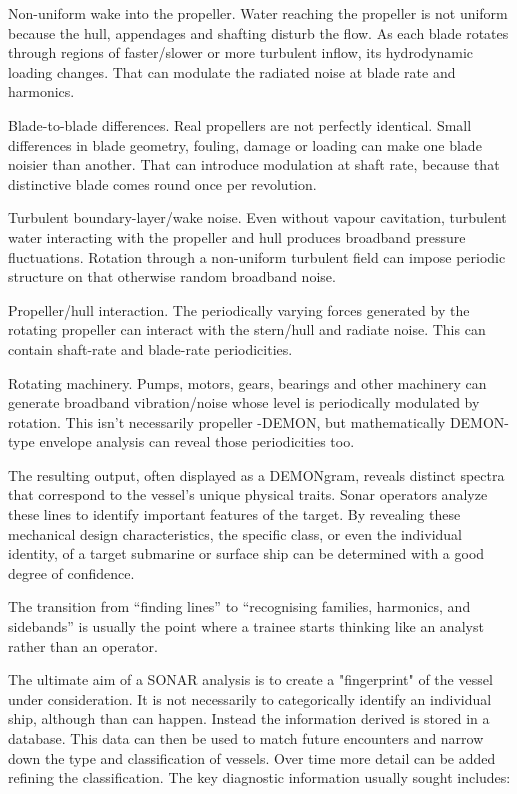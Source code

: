 \begin{compactitem}
    \item Non-uniform wake into the propeller. Water reaching the propeller is not uniform because the hull, appendages and shafting disturb the flow. As each blade rotates through regions of faster/slower or more turbulent inflow, its hydrodynamic loading changes. That can modulate the radiated noise at blade rate and harmonics.
    \item Blade-to-blade differences. Real propellers are not perfectly identical. Small differences in blade geometry, fouling, damage or loading can make one blade noisier than another. That can introduce modulation at shaft rate, because that distinctive blade comes round once per revolution.
    \item Turbulent boundary-layer/wake noise. Even without vapour cavitation, turbulent water interacting with the propeller and hull produces broadband pressure fluctuations. Rotation through a non-uniform turbulent field can impose periodic structure on that otherwise random broadband noise.
    \item Propeller/hull interaction. The periodically varying forces generated by the rotating propeller can interact with the stern/hull and radiate noise. This can contain shaft-rate and blade-rate periodicities.
    \item Rotating machinery. Pumps, motors, gears, bearings and other machinery can generate broadband vibration/noise whose level is periodically modulated by rotation. This isn't necessarily propeller -DEMON, but mathematically DEMON-type envelope analysis can reveal those periodicities too.
\end{compactitem}

The resulting output, often displayed as a DEMONgram, reveals distinct spectra that correspond to the vessel's unique physical traits. Sonar operators analyze these lines to identify important features of the  target. By revealing these mechanical design characteristics, the specific class, or even the individual identity, of a target submarine or surface ship can be determined with a good degree of confidence.

\begin{faintquote}
    The transition from “finding lines” to “recognising families, harmonics, and sidebands” is usually the point where a trainee starts thinking like an analyst rather than an operator.
\end{faintquote} 

The ultimate aim of a SONAR analysis is to create a "fingerprint" of the vessel under consideration. It is not necessarily to categorically identify an individual ship, although than can happen. Instead the information derived is stored in a database. This data can then be used to match future encounters and narrow down the type and classification of vessels. Over time more detail can be added refining the classification. The key diagnostic information usually sought includes:

